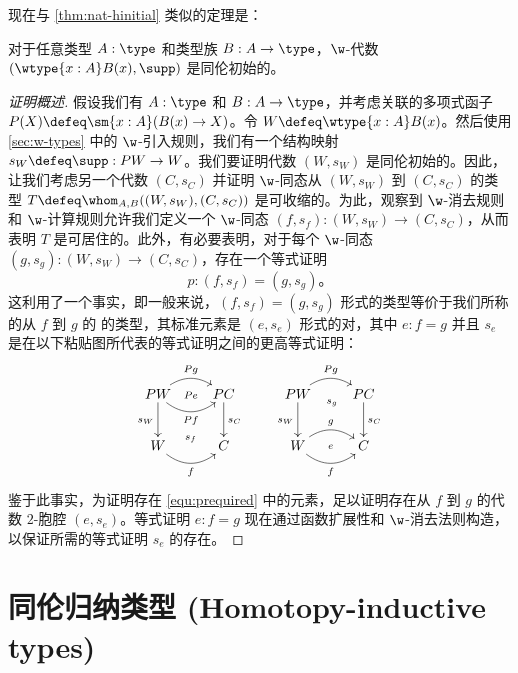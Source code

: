 现在与 \cref{thm:nat-hinitial} 类似的定理是：

\begin{thm}\label{thm:w-hinit}
对于任意类型 $A : \type$ 和类型族 $B : A \to \type$，$\w$-代数 $(\wtype{x:A}B(x), \supp)$ 是同伦初始的。
\end{thm}

\begin{proof}[证明概述]
    假设我们有 $A : \type$ 和 $B : A \to \type$，并考虑关联的多项式函子 $P(X)\defeq\sm{x:A}(B(x)\to X)$。令 $W \defeq \wtype{x:A}B(x)$。然后使用 \cref{sec:w-types} 中的 $\w$-引入规则，我们有一个结构映射 $s_W\defeq\supp: PW \rightarrow W$。我们要证明代数 $(W, s_W)$ 是同伦初始的。因此，让我们考虑另一个代数 $(C,s_C)$ 并证明 $\w$-同态从 $(W, s_W)$ 到 $(C, s_C)$ 的类型 $T\defeq \whom_{A,B}((W, s_W),(C,s_C)) $ 是可收缩的。为此，观察到 $\w$-消去规则和 $\w$-计算规则允许我们定义一个 $\w$-同态 $(f, s_f) : (W, s_W) \rightarrow (C, s_C)$，从而表明 $T$ 是可居住的。此外，有必要表明，对于每个 $\w$-同态 $(g, s_g) : (W, s_W) \rightarrow (C, s_C)$，存在一个等式证明
    \begin{equation}
        \label{equ:prequired}
        p :  (f,s_f) = (g,s_g)。
    \end{equation}
    这利用了一个事实，即一般来说，$(f,s_f) = (g,s_g) $ 形式的类型等价于我们所称的从 $f$ 到 $g$ 的 %
    的类型，其标准元素是 $(e, s_e)$ 形式的对，其中 $e : f=g$ 并且 $s_e$ 是在以下粘贴图所代表的等式证明之间的更高等式证明：
    \[
        \xymatrix{
            PW \ar@/^1pc/[r]^{Pg}   \ar[d]_{s_W}   \ar@/_1pc/[r]_{Pf} \ar@{}[r]|{Pe}
            & PC \ar[d]^{s_C}  \\
            W  \ar@/_1pc/[r]_f  \ar@{}[r]^{s_f} & C } \qquad
        \xymatrix{
            PW \ar@/^1pc/[r]^{Pg}   \ar[d]_{s_W} \ar@{}[r]_(.52){s_g}  & PC \ar[d]^{s_C}  \\
            W \ar@/^1pc/[r]^g  \ar@/_1pc/[r]_f  \ar@{}[r]|{e} & C }
    \]
    鉴于此事实，为证明存在 \eqref{equ:prequired} 中的元素，足以证明存在从 $f$ 到 $g$ 的代数 $2$-胞腔 $(e,s_e)$。等式证明 $e : f=g$ 现在通过函数扩展性和 $\w$-消去法则构造，以保证所需的等式证明 $s_e$ 的存在。
\end{proof}
\section{同伦归纳类型 (Homotopy-inductive types)}
\label{sec:htpy-inductive}

